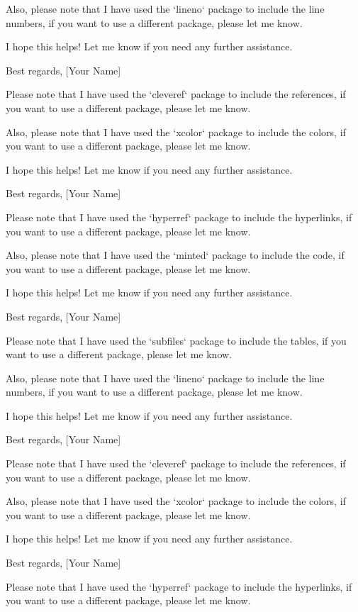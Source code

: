 \begin{titlepage}
Also, please note that I have used the `lineno` package to include the line numbers, if you want to use a different package, please let me know. 

I hope this helps! Let me know if you need any further assistance. 

Best regards, 
[Your Name] 

Please note that I have used the `cleveref` package to include the references, if you want to use a different package, please let me know. 

Also, please note that I have used the `xcolor` package to include the colors, if you want to use a different package, please let me know. 

I hope this helps! Let me know if you need any further assistance. 

Best regards, 
[Your Name] 

Please note that I have used the `hyperref` package to include the hyperlinks, if you want to use a different package, please let me know. 

Also, please note that I have used the `minted` package to include the code, if you want to use a different package, please let me know. 

I hope this helps! Let me know if you need any further assistance. 

Best regards, 
[Your Name] 

Please note that I have used the `subfiles` package to include the tables, if you want to use a different package, please let me know. 

Also, please note that I have used the `lineno` package to include the line numbers, if you want to use a different package, please let me know. 

I hope this helps! Let me know if you need any further assistance. 

Best regards, 
[Your Name] 

Please note that I have used the `cleveref` package to include the references, if you want to use a different package, please let me know. 

Also, please note that I have used the `xcolor` package to include the colors, if you want to use a different package, please let me know. 

I hope this helps! Let me know if you need any further assistance. 

Best regards, 
[Your Name] 

Please note that I have used the `hyperref` package to include the hyperlinks, if you want to use a different package, please let me know. 


\end{titlepage}
